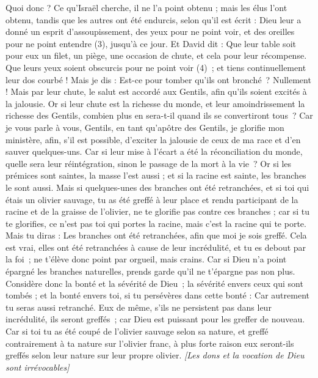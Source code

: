 \begin{multicols}{2}
Quoi donc ? Ce qu'Israël cherche, il ne l'a point obtenu ; mais les élus l’ont obtenu, tandis que les autres ont été endurcis,
selon qu'il est écrit : Dieu leur a donné un esprit d’assoupissement, des yeux pour ne point voir, et des oreilles pour ne point entendre (3), jusqu’à ce jour. Et David dit :
Que leur table soit pour eux un filet, un piège, une occasion de chute, et cela pour leur récompense.
Que leurs yeux soient obscurcis pour ne point voir (4) ; et tiens continuellement leur dos courbé !
Mais je dis : Est-ce pour tomber qu’ils ont bronché ? Nullement ! Mais par leur chute, le salut est accordé aux Gentils, afin qu’ils soient excités à la jalousie.
Or si leur chute est la richesse du monde, et leur amoindrissement la richesse des Gentils, combien plus en sera-t-il quand ils se convertiront tous ?
Car je vous parle à vous, Gentils, en tant qu’apôtre des Gentils, je glorifie mon ministère,
afin, s’il est possible, d’exciter la jalousie de ceux de ma race et d’en sauver quelques-uns.
Car si leur mise à l’écart a été la réconciliation du monde, quelle sera leur réintégration, sinon le passage de la mort à la vie ?
Or si les prémices sont saintes, la masse l'est aussi ; et si la racine est sainte, les branches le sont aussi.
Mais si quelques-unes des branches ont été retranchées, et si toi qui étais un olivier sauvage, tu as été greffé à leur place et rendu participant de la racine et de la graisse de l'olivier,
ne te glorifie pas contre ces branches ; car si tu te glorifies, ce n'est pas toi qui portes la racine, mais c'est la racine qui te porte.
Mais tu diras : Les branches ont été retranchées, afin que moi je sois greffé.
Cela est vrai, elles ont été retranchées à cause de leur incrédulité, et tu es debout par la foi ; ne t'élève donc point par orgueil, mais crains.
Car si Dieu n'a point épargné les branches naturelles, prends garde qu'il ne t'épargne pas non plus.
Considère donc la bonté et la sévérité de Dieu ; la sévérité envers ceux qui sont tombés ; et la bonté envers toi, si tu persévères dans cette bonté : Car autrement tu seras aussi retranché.
Eux de même, s'ils ne persistent pas dans leur incrédulité, ils seront greffés ; car Dieu est puissant pour les greffer de nouveau.
Car si toi tu as été coupé de l'olivier sauvage selon sa nature, et greffé contrairement à ta nature sur l'olivier franc, à plus forte raison eux seront-ils greffés selon leur nature sur leur propre olivier.
\textit{[Les dons et la vocation de Dieu sont irrévocables]}

\end{multicols}
